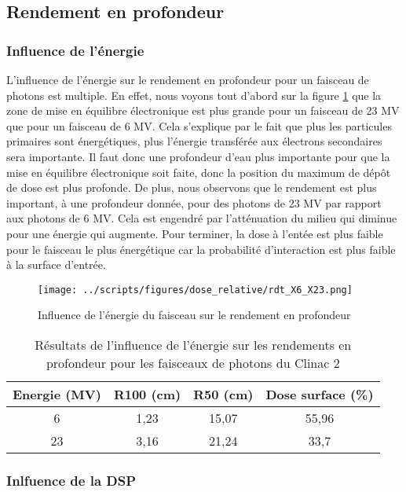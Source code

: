 \documentclass{article}
\begin{document}
\subsection{Rendement en profondeur}
\subsubsection{Influence de l'énergie}

L'influence de l'énergie sur le rendement en profondeur pour un faisceau de photons est multiple. En effet, nous voyons tout d'abord sur la figure \ref*{fig_rdt_energie} que la zone de mise en équilibre électronique est plus grande pour un faisceau de 23 MV que pour un faisceau de 6 MV. Cela s'explique par le fait que plus les particules primaires sont énergétiques, plus l'énergie transférée aux électrons secondaires sera importante. Il faut donc une profondeur d'eau plus importante pour que la mise en équilibre électronique soit faite, donc la position du maximum de dépôt de dose est plus profonde. De plus, nous observons que le rendement est plus important, à une profondeur donnée, pour des photons de 23 MV par rapport aux photons de 6 MV. Cela est engendré par l'atténuation du milieu qui diminue pour une énergie qui augmente. Pour terminer, la dose à l'entée est plus faible pour le faisceau le plus énergétique car la probabilité d'interaction est plus faible à la surface d'entrée.

\begin{figure}[h]
  \centering
  \texttt{[image: ../scripts/figures/dose\_relative/rdt\_X6\_X23.png]}
  \caption{Influence de l'énergie du faisceau sur le rendement en profondeur}
  \label{fig_rdt_energie}
\end{figure}

\begin{table}[h]
  \centering
  \begin{tabular}{cccc}
    \toprule
    \textbf{Energie (MV)} & \textbf{R100 (cm)} & \textbf{R50 (cm)} & \textbf{Dose surface (\%)} \\
    \toprule
    6 & 1,23 & 15,07 & 55,96 \\
    23 & 3,16 & 21,24 & 33,7 \\
    \bottomrule
  \end{tabular}
  \caption{Résultats de l'influence de l'énergie sur les rendements en profondeur pour les faisceaux de photons du Clinac 2}
  \label{table_rdt_energie}
\end{table}

\subsubsection{Inlfuence de la DSP}
\end{document}
